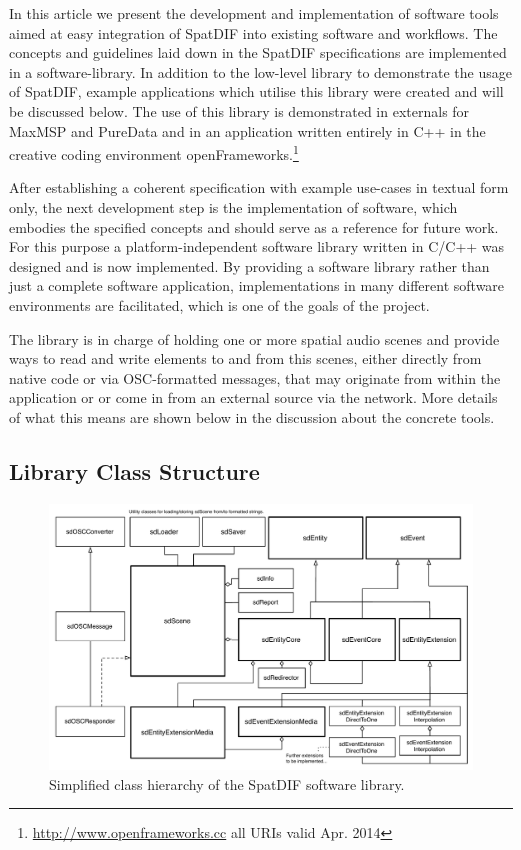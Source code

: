 \documentclass{article}
\begin{document}
In this article we present the development and implementation of software tools aimed at easy integration of SpatDIF into existing software and workflows.
The concepts and guidelines laid down in the SpatDIF specifications are implemented in a software-library.
In addition to the low-level library to demonstrate the usage of SpatDIF, example applications which utilise this library were created and will be discussed below.
The use of this library is demonstrated in externals for MaxMSP and PureData and in an application written entirely in C++ in the creative coding environment openFrameworks.\footnote{\url{http://www.openframeworks.cc} all URIs valid Apr. 2014}

After establishing a coherent specification with example use-cases in textual form only, the next development step is the implementation of software, which embodies the specified concepts and should serve as a reference for future work.
For this purpose a platform-independent software library written in C/C++ was designed and is now implemented.
By providing a software library rather than just a complete software application, implementations in many different software environments are facilitated, which is one of the goals of the project.

The library is in charge of holding one or more spatial audio scenes and provide ways to read and write elements to and from this scenes, either directly from native code or via OSC-formatted messages, that may originate from within the application or or come in from an external source via the network.
More details of what this means are shown below in the discussion about the concrete tools.

\subsection{Library Class Structure}\label{sec:class_structure}

\begin{figure}[h]
	\includegraphics[width=0.98\columnwidth]{class_diagram.pdf}
	\caption{Simplified class hierarchy of the SpatDIF software library.
\label{fig:class_structure}
}
\end{figure}
\end{document}
